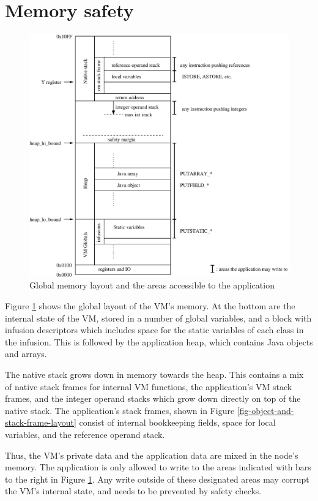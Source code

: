 \section{Memory safety}

\begin{figure}
\includegraphics[width=\linewidth]{memlayout.eps}
\caption{Global memory layout and the areas accessible to the application}
\label{fig-memlayout}
\end{figure}

Figure \ref{fig-memlayout} shows the global layout of the VM's memory. At the bottom are the internal state of the VM, stored in a number of global variables, and a block with infusion descriptors which includes space for the static variables of each class in the infusion. This is followed by the application heap, which contains Java objects and arrays.

The native stack grows down in memory towards the heap. This contains a mix of native stack frames for internal VM functions, the application's VM stack frames, and the integer operand stacks which grow down directly on top of the native stack. The application's stack frames, shown in Figure \ref{fig-object-and-stack-frame-layout} consist of internal bookkeeping fields, space for local variables, and the reference operand stack.

Thus, the VM's private data and the application data are mixed in the node's memory. The application is only allowed to write to the areas indicated with bars to the right in Figure \ref{fig-memlayout}. Any write outside of these designated areas may corrupt the VM's internal state, and needs to be prevented by safety checks.

